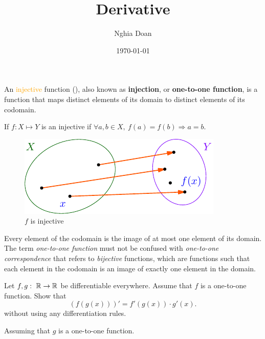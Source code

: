 \documentclass{article}
\title{Derivative}
\author{Nghia Doan}
\date{\today}
\begin{document}
\maketitle

\begin{definition*}
    An \textcolor{orange}{injective} function (), 
    also known as \textbf{injection}, or \textbf{one-to-one function}, is a function
    that maps distinct elements of its domain to distinct elements of its codomain.
    \begin{center}
        If $f: X \mapsto Y$ is an injective if $\forall a,b \in X,\ f(a)=f(b) \Rightarrow a=b$.
    \end{center}
\end{definition*}

\begin{figure}[ht]
    \centering
	\begin{minipage}[t]{6.5cm}
        \centering
	    \includegraphics{./asy/pdf/injective.pdf}
        \caption{$f$ is injective}
        \label{fig:injective}
	\end{minipage}
\end{figure}

Every element of the codomain is the image of at most one element of its domain.
The term \textit{one-to-one function} must not be confused with \textit{one-to-one correspondence}
that refers to \textit{bijective} functions, which are functions such that each element in the codomain
is an image of exactly one element in the domain.

\newpage

\begin{problem*}[Problem 1]
    Let $f,g:\ \mathbb R \rightarrow \mathbb R$ be differentiable everywhere. Assume that $f$ is a one-to-one function.
    Show that 
    \[
        \left(f(g(x))\right)' = f'(g(x)) \cdot g'(x).
    \]
    without using any differentiation rules.
\end{problem*}

\begin{remark*}
    Assuming that $g$ is a one-to-one function.
\end{remark*}
\end{document}
